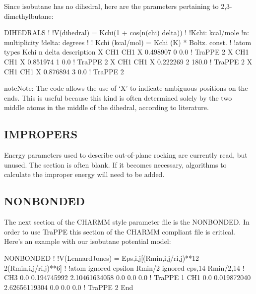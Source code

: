 \documentclass[letterpaper,10pt,english]{sphinxmanual}
\begin{document}
Since isobutane has no dihedral, here are the parameters pertaining to 2,3-dimethylbutane:

%
\begin{sphinxVerbatim}[commandchars=\\\{\}]
DIHEDRALS
!
!V(dihedral) = Kchi(1 + cos(n(chi) \PYGZhy{} delta))
!
!Kchi:  kcal/mole
!n:  multiplicity
!delta:  degrees
!
!  Kchi (kcal/mol) = Kchi (K) * Boltz.  const.
!
!atom types Kchi n delta description
X CH1 CH1 X \PYGZhy{}0.498907 0 0.0   !  TraPPE 2
X CH1 CH1 X  0.851974 1 0.0   !  TraPPE 2
X CH1 CH1 X \PYGZhy{}0.222269 2 180.0 !  TraPPE 2
X CH1 CH1 X  0.876894 3 0.0   !  TraPPE 2
\end{sphinxVerbatim}

\begin{sphinxadmonition}{note}{Note:}
The code allows the use of ‘X’ to indicate ambiguous positions on the ends. This is useful because this kind is often determined solely by the two middle atoms in the middle of the dihedral, according to literature.
\end{sphinxadmonition}


\subsection{IMPROPERS}
\label{\detokenize{input_file:impropers}}
Energy parameters used to describe out-of-plane rocking are currently read, but unused. The section is often blank. If it becomes necessary, algorithms to calculate the improper energy will need to be added.


\subsection{NONBONDED}
\label{\detokenize{input_file:nonbonded}}
The next section of the CHARMM style parameter file is the NONBONDED. In order to use TraPPE this section of the CHARMM compliant file is critical. Here’s an example with our isobutane potential model:

%
\begin{sphinxVerbatim}[commandchars=\\\{\}]
NONBONDED
!
!V(Lennard\PYGZhy{}Jones) = Eps,i,j[(Rmin,i,j/ri,j)**12 \PYGZhy{} 2(Rmin,i,j/ri,j)**6]
!
!atom ignored epsilon Rmin/2 ignored eps,1\PYGZhy{}4 Rmin/2,1\PYGZhy{}4
!
CH3 0.0 \PYGZhy{}0.194745992 2.10461634058 0.0 0.0 0.0 !  TraPPE 1
CH1 0.0 \PYGZhy{}0.019872040 2.62656119304 0.0 0.0 0.0 !  TraPPE 2
End
\end{sphinxVerbatim}
\end{document}
